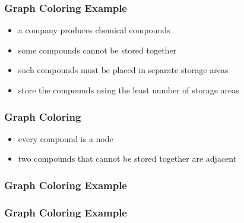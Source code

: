 \documentclass[dvipsnames]{beamer}
\begin{document}
\begin{frame}
  \frametitle{Graph Coloring Example}

  \begin{example}
    \begin{itemize}
      \item a company produces chemical compounds
      \item some compounds cannot be stored together
      \item such compounds must be placed in separate storage areas

      \pause
      \medskip
      \item store the compounds using the least number of storage areas
    \end{itemize}
  \end{example}
\end{frame}

\begin{frame}
  \frametitle{Graph Coloring}

  \begin{example}
    \begin{itemize}
      \item every compound is a node
      \item two compounds that cannot be stored together are adjacent
    \end{itemize}

    \begin{center}
    \end{center}
  \end{example}
\end{frame}

\begin{frame}
  \frametitle{Graph Coloring Example}

  \begin{example}
    \begin{center}
    \end{center}
  \end{example}
\end{frame}

\begin{frame}
  \frametitle{Graph Coloring Example}

  \begin{example}
    \begin{columns}
      \begin{center}
      \end{center}

      \begin{center}
      \end{center}
    \end{columns}
  \end{example}
\end{frame}
\end{document}

